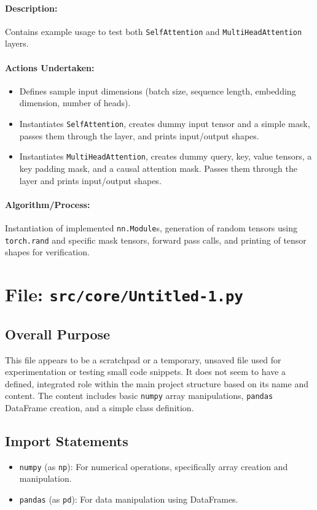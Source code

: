 \documentclass{article}
\begin{document}
\paragraph{Description:} Contains example usage to test both \texttt{SelfAttention} and \texttt{MultiHeadAttention} layers.
\paragraph{Actions Undertaken:}
\begin{itemize}
    \item Defines sample input dimensions (batch size, sequence length, embedding dimension, number of heads).
    \item Instantiates \texttt{SelfAttention}, creates dummy input tensor and a simple mask, passes them through the layer, and prints input/output shapes.
    \item Instantiates \texttt{MultiHeadAttention}, creates dummy query, key, value tensors, a key padding mask, and a causal attention mask. Passes them through the layer and prints input/output shapes.
\end{itemize}
\paragraph{Algorithm/Process:} Instantiation of implemented \texttt{nn.Module}s, generation of random tensors using \texttt{torch.rand} and specific mask tensors, forward pass calls, and printing of tensor shapes for verification.

\newpage
\section{File: \texttt{src/core/Untitled-1.py}}
\subsection{Overall Purpose}
This file appears to be a scratchpad or a temporary, unsaved file used for experimentation or testing small code snippets. It does not seem to have a defined, integrated role within the main project structure based on its name and content. The content includes basic \texttt{numpy} array manipulations, \texttt{pandas} DataFrame creation, and a simple class definition.

\subsection{Import Statements}
\begin{itemize}
    \item \texttt{numpy} (as \texttt{np}): For numerical operations, specifically array creation and manipulation.
    \item \texttt{pandas} (as \texttt{pd}): For data manipulation using DataFrames.
\end{itemize}
\end{document}
